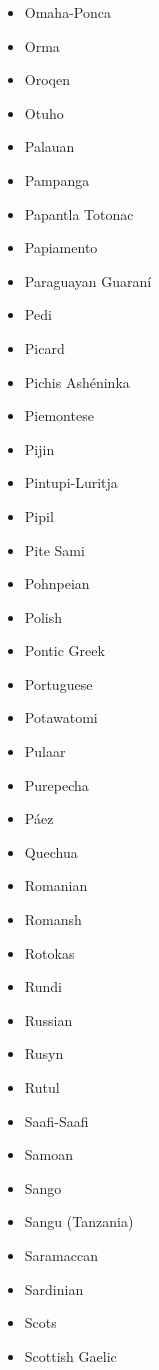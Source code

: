 \documentclass[paper=a4, 10pt]{scrbook}
\begin{document}
\begin{multicols}{3}
\begin{itemize}
        \item Omaha-Ponca
        \item Orma
        \item Oroqen
        \item Otuho
        \item Palauan
        \item Pampanga
        \item Papantla Totonac
        \item Papiamento
        \item Paraguayan Guaraní
        \item Pedi
        \item Picard
        \item Pichis Ashéninka
        \item Piemontese
        \item Pijin
        \item Pintupi-Luritja
        \item Pipil
        \item Pite Sami
        \item Pohnpeian
        \item Polish
        \item Pontic Greek
        \item Portuguese
        \item Potawatomi
        \item Pulaar
        \item Purepecha
        \item Páez
        \item Quechua
        \item Romanian
        \item Romansh
        \item Rotokas
        \item Rundi
        \item Russian
        \item Rusyn
        \item Rutul
        \item Saafi-Saafi
        \item Samoan
        \item Sango
        \item Sangu (Tanzania)
        \item Saramaccan
        \item Sardinian
        \item Scots
        \item Scottish Gaelic

\end{itemize}
\end{multicols}
\end{document}
